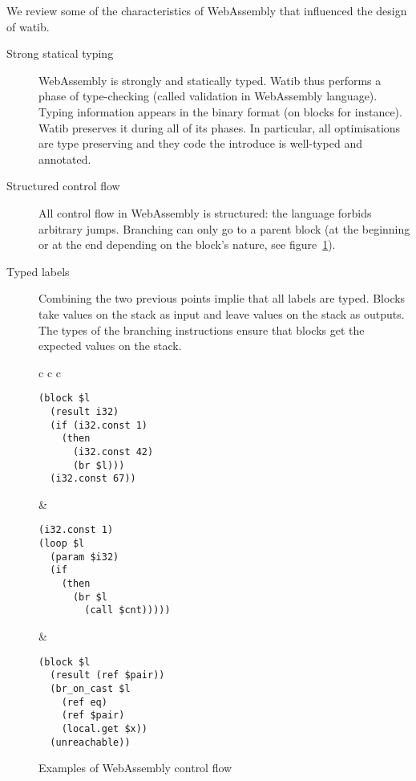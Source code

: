 \documentclass[11pt]{article}
\begin{document}
We review some of the characteristics of WebAssembly that influenced the design
of watib.

\begin{description}
\item[Strong statical typing]
WebAssembly is strongly and statically typed. Watib thus performs a phase of
type-checking (called validation in WebAssembly language). Typing information
appears in the binary format (on blocks for instance). Watib preserves it during
all of its phases. In particular, all optimisations are type preserving and they
code the introduce is well-typed and annotated.

\item[Structured control flow]
All control flow in WebAssembly is structured: the language forbids arbitrary
jumps. Branching can only go to a parent block (at the beginning or at the end
depending on the block's nature, see figure~\ref{cf-ex}).

\item[Typed labels]
Combining the two previous points implie that all labels are typed. Blocks take
values on the stack as input and leave values on the stack as outputs. The types
of the branching instructions ensure that blocks get the expected values on the
stack.
\end{description}
\begin{figure}[h]
\centering
\begin{tabular}{c c c}
\begin{minipage}{1.8in}
\begin{verbatim}
(block $l
  (result i32)
  (if (i32.const 1)
    (then
      (i32.const 42)
      (br $l)))
  (i32.const 67))
\end{verbatim}
\end{minipage}&
\begin{minipage}{1.8in}
\begin{verbatim}
(i32.const 1)
(loop $l
  (param $i32)
  (if
    (then
      (br $l
        (call $cnt)))))
\end{verbatim}
\end{minipage}
&\begin{minipage}{1.8in}
\begin{verbatim}
(block $l
  (result (ref $pair))
  (br_on_cast $l
    (ref eq)
    (ref $pair)
    (local.get $x))
  (unreachable))
\end{verbatim}
\end{minipage}
\end{tabular}
\caption{Examples of WebAssembly control flow}\label{cf-ex}
\end{figure}
\end{document}

